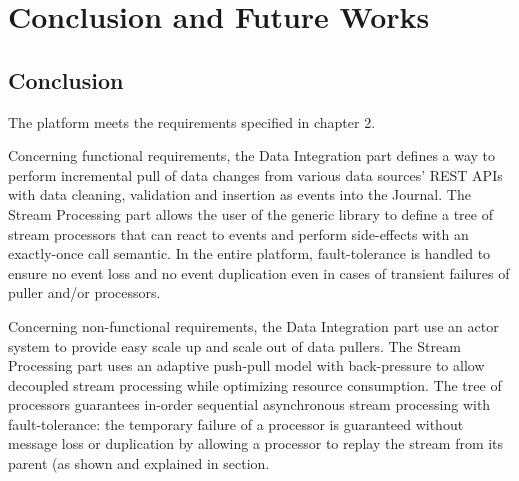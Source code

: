 \chapter{Conclusion and Future Works}

\section{Conclusion}

The platform meets the requirements specified in chapter 2. 

Concerning functional requirements, the Data Integration part defines a way to perform incremental pull of data changes from various data sources' REST APIs with data cleaning, validation and insertion as events into the Journal. The Stream Processing part allows the user of the generic library to define a tree of stream processors that can react to events and perform side-effects with an exactly-once call semantic. In the entire platform, fault-tolerance is handled to ensure no event loss and no event duplication even in cases of transient failures of puller and/or processors.

Concerning non-functional requirements, the Data Integration part use an actor system to provide easy scale up and scale out of data pullers. The Stream Processing part uses an adaptive push-pull model with back-pressure to allow decoupled stream processing while optimizing resource consumption. The tree of processors guarantees in-order sequential asynchronous stream processing with fault-tolerance: the temporary failure of a processor is guaranteed without message loss or duplication by allowing a processor to replay the stream from its parent (as shown and explained in section.
\\

